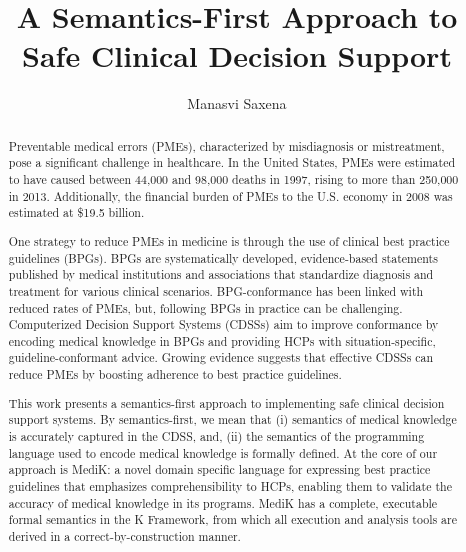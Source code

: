 \documentclass{uiucthesis2021}
\begin{document}
\title{A Semantics-First Approach to Safe Clinical Decision Support}
\author{Manasvi Saxena}
\phdthesis
{}
\maketitle

\frontmatter

\begin{abstract}
  Preventable medical errors (PMEs), characterized by misdiagnosis or mistreatment,
  pose a significant challenge in healthcare.
  In the United States, PMEs were estimated to have caused between
  44,000 and 98,000 deaths in 1997,
  rising to more than 250,000 in 2013. Additionally, the
  financial burden of PMEs to the U.S. economy in 2008 was estimated at \$19.5 billion.

  One strategy to reduce PMEs in medicine is through the use of
  clinical best practice guidelines (BPGs). BPGs are systematically developed,
  evidence-based statements published by medical institutions and associations
  that standardize diagnosis and treatment for various clinical scenarios.
  BPG-conformance has been linked with reduced rates of PMEs, but,
  following BPGs in practice can be challenging.
  Computerized Decision Support Systems (CDSSs) aim to improve conformance
  by encoding medical knowledge in BPGs and providing HCPs with
  situation-specific, guideline-conformant advice.
  Growing evidence suggests that
  effective CDSSs can reduce PMEs by boosting adherence to best practice guidelines.

  This work presents a semantics-first approach to implementing safe clinical
  decision support systems. By semantics-first,
  we mean that (i) semantics of medical knowledge is
  accurately captured in the CDSS, and, (ii) the semantics of the programming language
  used to encode medical knowledge is formally defined.
  At the core of our approach is MediK: a novel domain specific language
  for expressing best practice guidelines that emphasizes comprehensibility
  to HCPs, enabling them to validate the accuracy of medical knowledge in its
  programs. MediK has a complete, executable formal semantics in the K Framework,
  from which all execution and analysis tools are derived in a
  correct-by-construction manner.


\end{abstract}
\end{document}

